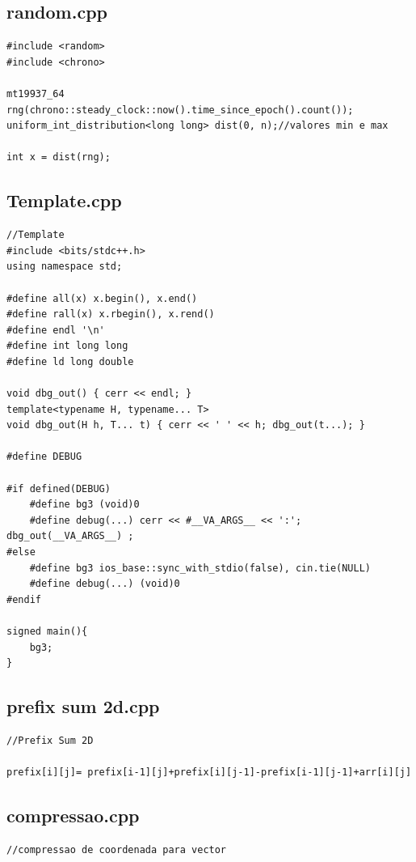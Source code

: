 \documentclass[11pt, a4paper, twoside]{article}
\begin{document}
{\subsection{random.cpp}
\begin{lstlisting}
#include <random>
#include <chrono>

mt19937_64 rng(chrono::steady_clock::now().time_since_epoch().count());
uniform_int_distribution<long long> dist(0, n);//valores min e max

int x = dist(rng);
\end{lstlisting}

\subsection{Template.cpp}
\begin{lstlisting}
//Template
#include <bits/stdc++.h>
using namespace std;

#define all(x) x.begin(), x.end()
#define rall(x) x.rbegin(), x.rend()
#define endl '\n'
#define int long long
#define ld long double

void dbg_out() { cerr << endl; }
template<typename H, typename... T> 
void dbg_out(H h, T... t) { cerr << ' ' << h; dbg_out(t...); }

#define DEBUG

#if defined(DEBUG)
    #define bg3 (void)0
    #define debug(...) cerr << #__VA_ARGS__ << ':'; dbg_out(__VA_ARGS__) ;
#else
    #define bg3 ios_base::sync_with_stdio(false), cin.tie(NULL)
    #define debug(...) (void)0
#endif

signed main(){
    bg3;
}
\end{lstlisting}

\subsection{prefix sum 2d.cpp}
\begin{lstlisting}
//Prefix Sum 2D

prefix[i][j]= prefix[i-1][j]+prefix[i][j-1]-prefix[i-1][j-1]+arr[i][j]​

\end{lstlisting}

\subsection{compressao.cpp}
\begin{lstlisting}
//compressao de coordenada para vector


\end{lstlisting}}
\end{document}
